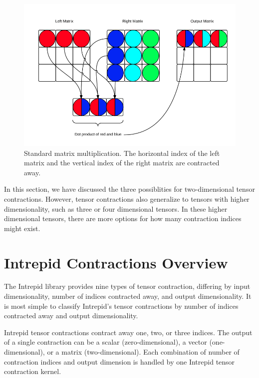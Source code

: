 \begin{figure}[h]
    \centering
    \includegraphics[scale = 0.4]{./matrix_mutiplication.png}
\caption{Standard matrix multiplication. The horizontal index of the left
    matrix and the vertical index of the right matrix are contracted away.
\label{fig:MatrixMultiplication}}
\end{figure}


In this section, we have discussed the three possiblities for two-dimensional
tensor contractions. However, tensor contractions also generalize to tensors
with higher dimensionality, such as three or four dimensional tensors. In 
these higher dimensional tensors, there are more options for how many contraction 
indices might exist.

\section{Intrepid Contractions Overview}
The Intrepid library provides nine types of tensor contraction, differing by input
dimensionality, number of indices contracted away, and output dimensionality.
It is most simple to classify Intrepid's tensor contractions by number of
indices contracted away and output dimensionality.

Intrepid tensor contractions contract away one, two, or three indices. The
output of a single contraction can be a scalar (zero-dimensional), a vector
(one-dimensional), or a matrix (two-dimensional). Each combination of number of
contraction indices and output dimension is handled by one Intrepid tensor
contraction kernel.

